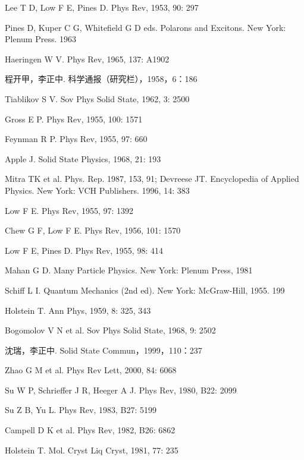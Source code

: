 \begin{canKao}
\begin{enumerate}[label={[\arabic*]}, leftmargin=2.2em, itemsep=0pt]
\item Lee T D, Low F E, Pines D. Phys Rev, 1953, 90: 297
\item Pines D, Kuper C G, Whitefield G D eds. Polarons and Excitons. New York: Plenum Press. 1963
\item Haeringen W V. Phys Rev, 1965, 137: A1902
\item 程开甲，李正中. 科学通报（研究栏），1958，6：186
\item Tiablikov S V. Sov Phys Solid State, 1962, 3: 2500
\item Gross E P. Phys Rev, 1955, 100: 1571
\item Feynman R P. Phys Rev, 1955, 97: 660
\item Apple J. Solid State Physics, 1968, 21: 193
\item Mitra TK et al. Phys. Rep. 1987, 153, 91; Devreese JT. Encyclopedia of Applied Physics. New York: VCH Publishers. 1996, 14: 383
\item Low F E. Phys Rev, 1955, 97: 1392
\item Chew G F, Low F E. Phys Rev, 1956, 101: 1570
\item Low F E, Pines D. Phys Rev, 1955, 98: 414
\item Mahan G D. Many Particle Physics. New York: Plenum Press, 1981
\item Schiff L I. Quantum Mechanics (2nd ed). New York: McGraw-Hill, 1955. 199
\item Holstein T. Ann Phys, 1959, 8: 325, 343
\item Bogomolov V N et al. Sov Phys Solid State, 1968, 9: 2502
\item 沈瑞，李正中. Solid State Commun，1999，110：237
\item Zhao G M et al. Phys Rev Lett, 2000, 84: 6068
\item Su W P, Schrieffer J R, Heeger A J. Phys Rev, 1980, B22: 2099
\item Su Z B, Yu L. Phys Rev, 1983, B27: 5199
\item Campell D K et al. Phys Rev, 1982, B26: 6862
\item Holstein T. Mol. Cryst Liq Cryst, 1981, 77: 235
\end{enumerate}
\end{canKao}

